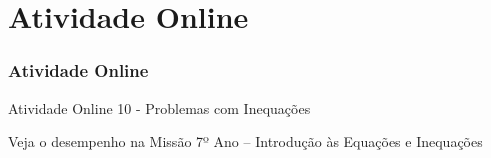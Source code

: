 
\section{Atividade Online}
\begin{frame}
\frametitle{Atividade Online} %

{Atividade Online 10 - Problemas com Inequações}


Veja o desempenho na Missão 7º Ano -- Introdução às Equações e
Inequações

\end{frame}
